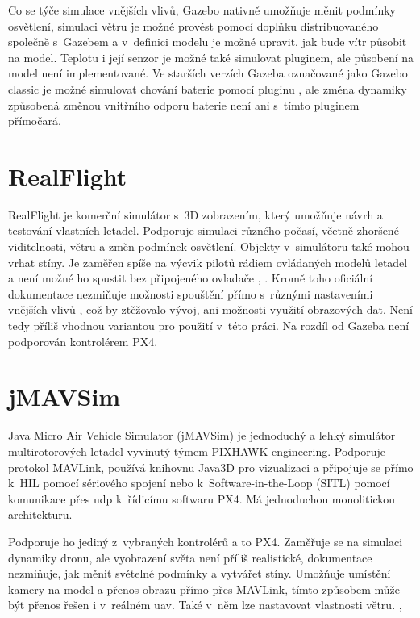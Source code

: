         Co se týče simulace vnějších vlivů, Gazebo nativně umožňuje měnit podmínky osvětlení, simulaci větru je možné provést pomocí doplňku distribuovaného společně s~Gazebem a v~definici modelu je možné upravit, jak bude vítr působit na model. Teplotu i její senzor je možné také simulovat pluginem, ale působení na model není implementované. Ve starších verzích Gazeba označované jako Gazebo classic je možné simulovat chování baterie pomocí pluginu \cite{batplugin}, ale změna dynamiky způsobená změnou vnitřního odporu baterie není ani s~tímto pluginem přímočará.

    \section{RealFlight} \label{sec:realflight}
        RealFlight je komerční simulátor s~3D zobrazením, který umožňuje návrh a testování vlastních letadel. Podporuje simulaci různého počasí, včetně zhoršené viditelnosti, větru a změn podmínek osvětlení. Objekty v~simulátoru také mohou vrhat stíny. Je zaměřen spíše na výcvik pilotů rádiem ovládaných modelů letadel a není možné ho spustit bez připojeného ovladače \cite{ardupilot:realflight}, \cite{realflight}. Kromě toho oficiální dokumentace nezmiňuje možnosti spouštění přímo s~různými nastaveními vnějších vlivů \cite{realflight}, což by ztěžovalo vývoj, ani možnosti využití obrazových dat. Není tedy příliš vhodnou variantou pro použití v~této práci. Na rozdíl od Gazeba není podporován kontrolérem PX4.

    \section{jMAVSim} \label{sec:jmavsim}
        Java Micro Air Vehicle Simulator (jMAVSim) je jednoduchý a lehký simulátor multirotorových letadel vyvinutý týmem PIXHAWK engineering. Podporuje protokol MAVLink, používá knihovnu Java3D pro vizualizaci a připojuje se přímo k~HIL pomocí sériového spojení nebo k~Software-in-the-Loop (SITL) pomocí komunikace přes \acrfull{udp} k~řídicímu softwaru PX4. Má jednoduchou monolitickou architekturu. \cite{Ebeid2018}

        Podporuje ho jediný z~vybraných kontrolérů a to PX4. Zaměřuje se na simulaci dynamiky dronu, ale vyobrazení světa není příliš realistické, dokumentace nezmiňuje, jak měnit světelné podmínky a vytvářet stíny. Umožňuje umístění kamery na model a přenos obrazu přímo přes MAVLink, tímto způsobem může být přenos řešen i v~reálném \acrshort{uav}. Také v~něm lze nastavovat vlastnosti větru. \cite{jmavsim}, \cite{px4:jmavsim}

